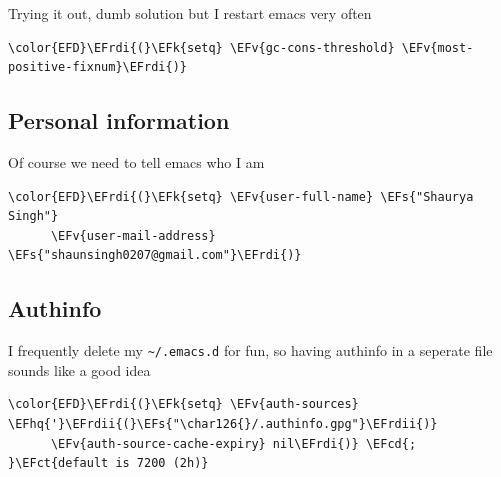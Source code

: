 \documentclass{scrartcl}
\newcommand{\EFk}[1]{\textcolor{EFk}{#1}} %
\newcommand{\EFs}[1]{\textcolor{EFs}{#1}} %
\newcommand{\EFct}[1]{\textcolor{EFct}{#1}} %
\newcommand{\EFv}[1]{\textcolor{EFv}{#1}} %
\newcommand{\EFcd}[1]{\textcolor{EFcd}{#1}} %
\newcommand{\EFhq}[1]{#1} %
\newcommand{\EFrdi}[1]{#1} %
\newcommand{\EFrdii}[1]{#1} %
\begin{document}
Trying it out, dumb solution but I restart emacs very often
\begin{Code}
\begin{Verbatim}[]
\color{EFD}\EFrdi{(}\EFk{setq} \EFv{gc-cons-threshold} \EFv{most-positive-fixnum}\EFrdi{)}
\end{Verbatim}
\end{Code}

\subsection{Personal information}
\label{sec:orgbea1116}
Of course we need to tell emacs who I am
\begin{Code}
\begin{Verbatim}[]
\color{EFD}\EFrdi{(}\EFk{setq} \EFv{user-full-name} \EFs{"Shaurya Singh"}
      \EFv{user-mail-address} \EFs{"shaunsingh0207@gmail.com"}\EFrdi{)}
\end{Verbatim}
\end{Code}

\subsection{Authinfo}
\label{sec:orgfb37efd}
I frequently delete my \texttt{\textasciitilde{}/.emacs.d} for fun, so having authinfo in a seperate file
sounds like a good idea
\begin{Code}
\begin{Verbatim}[]
\color{EFD}\EFrdi{(}\EFk{setq} \EFv{auth-sources} \EFhq{'}\EFrdii{(}\EFs{"\char126{}/.authinfo.gpg"}\EFrdii{)}
      \EFv{auth-source-cache-expiry} nil\EFrdi{)} \EFcd{; }\EFct{default is 7200 (2h)}
\end{Verbatim}
\end{Code}
\end{document}
